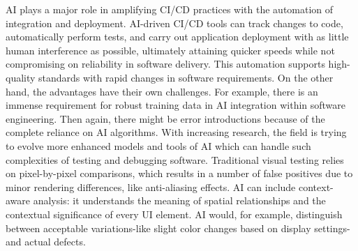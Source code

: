 AI plays a major role in amplifying CI/CD practices with the automation of integration and deployment. AI-driven CI/CD tools can track changes to code, automatically perform tests, and carry out application deployment with as little human interference as possible, ultimately attaining quicker speeds while not compromising on reliability in software delivery.
\autocite{Mohammed2024}
This automation supports high-quality standards with rapid changes in software requirements.
On the other hand, the advantages have their own challenges. For example, there is an immense requirement for robust training data in AI integration within software engineering. Then again, there might be error introductions because of the complete reliance on AI algorithms. With increasing research, the field is trying to evolve more enhanced models and tools of AI which can handle such complexities of testing and debugging software.
\autocite{Steidl2023}
Traditional visual testing relies on pixel-by-pixel comparisons, which results in a number of false positives due to minor rendering differences, like anti-aliasing effects. AI can include context-aware analysis: it understands the meaning of spatial relationships and the contextual significance of every UI element. AI would, for example, distinguish between acceptable variations-like slight color changes based on display settings-and actual defects.
\autocite{Moradi2024}

